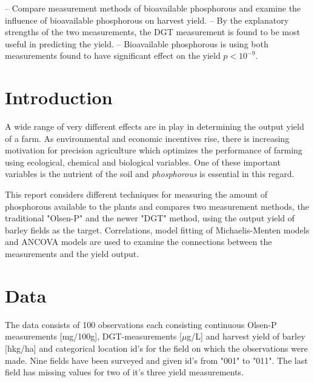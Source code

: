 \documentclass[12pt,fleqn]{article}
\title{}
\author{Asger Schultz}
\date{\today}
\begin{document}
\maketitle
-- Compare measurement methods of bioavailable phosphorous and examine the influence of bioavailable phosphorous on harvest yield. 
-- By the explanatory strengths of the two measurements, the DGT measurement is found to be most useful in predicting the yield.
-- Bioavailable phosphorous is using both measurements found to have significant effect on the yield \(p<10^{-9}\).
\tableofcontents
\newpage 
\section{Introduction}
A wide range of very different effects are in play in determining the output yield of a farm.
As environmental and economic incentives rise, there is increasing motivation for precision agriculture which optimizes the performance of farming using ecological, chemical and biological variables.
One of these important variables is the nutrient of the soil and \textit{phosphorous} is essential in this regard.


This report considers different techniques for measuring the amount of phosphorous available to the plants and compares two measurement methods, the traditional "Olsen-P" and the newer "DGT" method, using the output yield of barley fields as the target.  
Correlations, model fitting of Michaelis-Menten models and ANCOVA models are used to examine the connections between the measurements and the yield output.
\section{Data}
The data consists of 100 observations each consisting continuous  Olsen-P measurements [mg/100g], DGT-measurements [\(\mu\)g/L] and harvest yield of barley [hkg/ha] and categorical location id's for the field on which the observations were made. Nine fields have been surveyed and given id's from "001" to "011". The last field has missing values for two of it's three yield measurements.  
\end{document}

